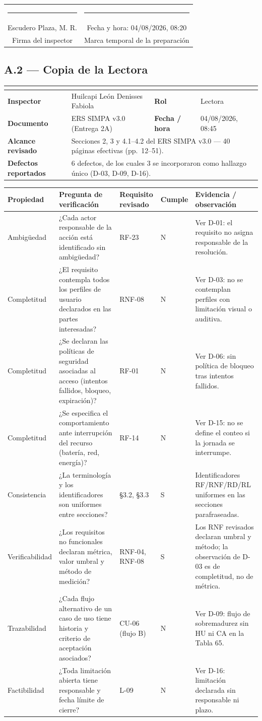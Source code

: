 \documentclass[11pt,letterpaper]{article}
\makeatletter
\newcommand{\ficha}[5]{%
\begin{center}\small
\begin{tabularx}{\textwidth}{|>{\bfseries}p{3.2cm}|X|>{\bfseries}p{2.6cm}|p{4.2cm}|}
\hline
\rowcolor{gris}\multicolumn{4}{|l|}{\bfseries Lista de verificación de inspección --- Anexo A (ISO/IEC/IEEE 29148:2018, §6.4)}\\
\hline
Inspector & #1 & Rol & #2 \\
\hline
Documento & ERS SIMPA v3.0 (Entrega 2A) & Fecha / hora & #3 \\
\hline
Alcance revisado & \multicolumn{3}{p{12.6cm}|}{#4} \\
\hline
Defectos reportados & \multicolumn{3}{p{12.6cm}|}{#5} \\
\hline
\end{tabularx}
\end{center}}
\newcommand{\cabecera}{%
\rowcolor{gris}\textbf{Propiedad} & \textbf{Pregunta de verificación} & \textbf{Requisito revisado} & \textbf{Cumple} & \textbf{Evidencia / observación}\\}
\newcommand{\firma}[2]{%
\vspace{0.5cm}
\begin{center}
\begin{tabular}{c@{\hspace{2.5cm}}c}
\rule{6cm}{0.4pt} & \rule{5cm}{0.4pt}\\
{\small #1} & {\small Fecha y hora: #2}\\
{\small Firma del inspector} & {\small Marca temporal de la preparación}\\
\end{tabular}
\end{center}}
\makeatother
\begin{document}
\firma{Escudero Plaza, M. R.}{04/08/2026, 08:20}

\clearpage

\subsection*{A.2 --- Copia de la Lectora}
\ficha{Huilcapi León Denisses Fabiola}{Lectora}{04/08/2026, 08:45}
{Secciones 2, 3 y 4.1--4.2 del ERS SIMPA v3.0 --- 40 páginas efectivas (pp.\ 12--51).}
{6 defectos, de los cuales 3 se incorporaron como hallazgo único (D-03, D-09, D-16).}

\begin{center}\footnotesize
\begin{tabularx}{\textwidth}{P{2.0cm} X P{2.5cm} C{1.2cm} P{3.2cm}}
\toprule
\cabecera
\midrule
Ambigüedad & ¿Cada actor responsable de la acción está identificado sin ambigüedad? & RF-23 & N & Ver D-01: el requisito no asigna responsable de la resolución.\\
Completitud & ¿El requisito contempla todos los perfiles de usuario declarados en las partes interesadas? & RNF-08 & N & Ver D-03: no se contemplan perfiles con limitación visual o auditiva.\\
Completitud & ¿Se declaran las políticas de seguridad asociadas al acceso (intentos fallidos, bloqueo, expiración)? & RF-01 & N & Ver D-06: sin política de bloqueo tras intentos fallidos.\\
Completitud & ¿Se especifica el comportamiento ante interrupción del recurso (batería, red, energía)? & RF-14 & N & Ver D-15: no se define el conteo si la jornada se interrumpe.\\
Consistencia & ¿La terminología y los identificadores son uniformes entre secciones? & §3.2, §3.3 & S & Identificadores RF/RNF/RD/RL uniformes en las secciones parafraseadas.\\
Verificabilidad & ¿Los requisitos no funcionales declaran métrica, valor umbral y método de medición? & RNF-04, RNF-08 & S & Los RNF revisados declaran umbral y método; la observación de D-03 es de completitud, no de métrica.\\
Trazabilidad & ¿Cada flujo alternativo de un caso de uso tiene historia y criterio de aceptación asociados? & CU-06 (flujo B) & N & Ver D-09: flujo de sobremadurez sin HU ni CA en la Tabla 65.\\
Factibilidad & ¿Toda limitación abierta tiene responsable y fecha límite de cierre? & L-09 & N & Ver D-16: limitación declarada sin responsable ni plazo.\\
\bottomrule
\end{tabularx}
\end{center}
\end{document}
